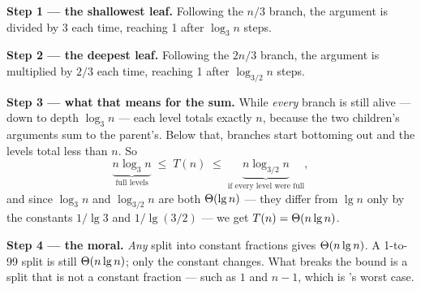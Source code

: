 \begin{worked}[$T(n) = T(n/3) + T(2n/3) + n$]
\textbf{Step 1 --- the shallowest leaf.} Following the $n/3$ branch, the
argument is divided by 3 each time, reaching 1 after $\log_{3} n$ steps.

\smallskip
\textbf{Step 2 --- the deepest leaf.} Following the $2n/3$ branch, the argument
is multiplied by $2/3$ each time, reaching 1 after $\log_{3/2} n$ steps.

\smallskip
\textbf{Step 3 --- what that means for the sum.} While \emph{every} branch is
still alive --- down to depth $\log_{3} n$ --- each level totals exactly $n$,
because the two children's arguments sum to the parent's. Below that, branches
start bottoming out and the levels total less than $n$. So
\[ \underbrace{n \log_{3} n}_{\text{full levels}}
   \;\le\; T(n) \;\le\; \underbrace{n \log_{3/2} n}_{\text{if every level were full}}, \]
and since $\log_{3} n$ and $\log_{3/2} n$ are both $\Theta(\operatorname{lg} n)$ --- they
differ from $\lg n$ only by the constants $1/\lg 3$ and $1/\lg(3/2)$ --- we get
$T(n) = \Theta(n \operatorname{lg} n)$.

\smallskip
\textbf{Step 4 --- the moral.} \emph{Any} split into constant fractions gives
$\Theta(n\operatorname{lg} n)$. A 1-to-99 split is still $\Theta(n\operatorname{lg} n)$; only the constant
changes. What breaks the bound is a split that is not a constant fraction ---
such as $1$ and $n-1$, which is 's worst case.
\end{worked}

